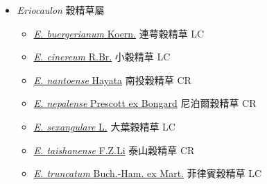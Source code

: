 
  \begin{itemize}
 \item[] \textit{Eriocaulon} 穀精草屬
                                
  \begin{itemize}
        \item[] \href{http://www.theplantlist.org/tpl1.1/search?q=Eriocaulon+buergerianum}{\textit{E. buergerianum} Koern.}   連萼穀精草   LC
        \item[] \href{http://www.theplantlist.org/tpl1.1/search?q=Eriocaulon+cinereum}{\textit{E. cinereum} R.Br.}   小穀精草   LC
        \item[] \href{http://www.theplantlist.org/tpl1.1/search?q=Eriocaulon+nantoense}{\textit{E. nantoense} Hayata}   南投穀精草   CR
        \item[] \href{http://www.theplantlist.org/tpl1.1/search?q=Eriocaulon+nepalense}{\textit{E. nepalense} Prescott ex Bongard}   尼泊爾穀精草   CR
        \item[] \href{http://www.theplantlist.org/tpl1.1/search?q=Eriocaulon+sexangulare}{\textit{E. sexangulare} L.}   大葉穀精草   LC
        \item[] \href{http://www.theplantlist.org/tpl1.1/search?q=Eriocaulon+taishanense}{\textit{E. taishanense} F.Z.Li}   泰山穀精草   CR
        \item[] \href{http://www.theplantlist.org/tpl1.1/search?q=Eriocaulon+truncatum}{\textit{E. truncatum} Buch.-Ham. ex Mart.}   菲律賓穀精草   LC
  \end{itemize}
  \end{itemize}

